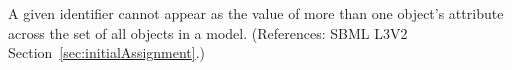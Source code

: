 A given identifier cannot appear as the value of more than one
\InitialAssignment{} object's  attribute across the set of
all \InitialAssignment{} objects in a model.  (References: SBML L3V2
Section~\ref{sec:initialAssignment}.)
